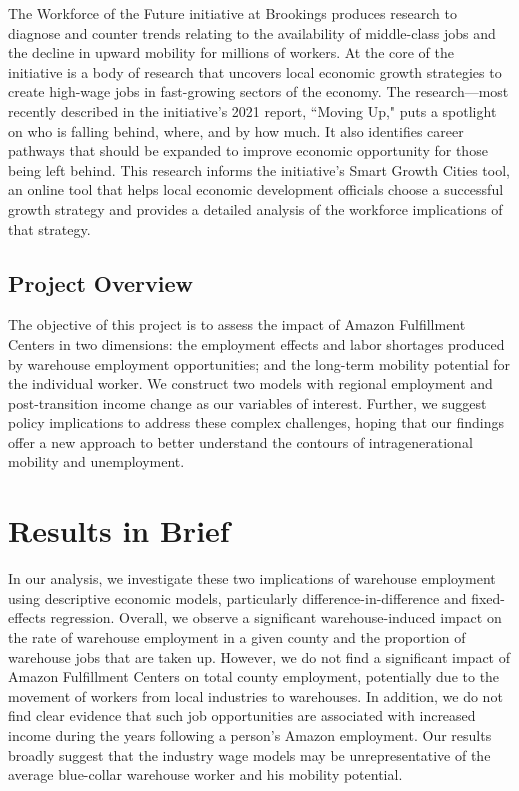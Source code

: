 \documentclass[11pt]{article}
\begin{document}
\-\hspace{0.5cm} The Workforce of the Future initiative at Brookings produces research to diagnose and counter trends relating to the availability of middle-class jobs and the decline in upward mobility for millions of workers. At the core of the initiative is a body of research that uncovers local economic growth strategies to create high-wage jobs in fast-growing sectors of the economy. The research—most recently described in the initiative’s 2021 report, “Moving Up," puts a spotlight on who is falling behind, where, and by how much. It also identifies career pathways that should be expanded to improve economic opportunity for those being left behind. This research informs the initiative’s Smart Growth Cities tool, an online tool that helps local economic development officials choose a successful growth strategy and provides a detailed analysis of the workforce implications of that strategy.

\subsection{Project Overview}

\-\hspace{0.5cm} The objective of this project is to assess the impact of Amazon Fulfillment Centers in two dimensions: the employment effects and labor shortages produced by warehouse employment opportunities; and the long-term mobility potential for the individual worker. We construct two models with regional employment and post-transition income change as our variables of interest. Further, we suggest policy implications to address these complex challenges, hoping that our findings offer a new approach to better understand the contours of intragenerational mobility and unemployment. 

\clearpage

\section{Results in Brief}

\-\hspace{0.5cm} In our analysis, we investigate these two implications of warehouse employment using descriptive economic models, particularly difference-in-difference and fixed-effects regression. Overall, we observe a significant warehouse-induced impact on the rate of warehouse employment in a given county and the proportion of warehouse jobs that are taken up. However, we do not find a significant impact of Amazon Fulfillment Centers on total county employment, potentially due to the movement of workers from local industries to warehouses. In addition, we do not find clear evidence that such job opportunities are associated with increased income during the years following a person's Amazon employment. Our results broadly suggest that the industry wage models may be unrepresentative of the average blue-collar warehouse worker and his mobility potential.
\end{document}
